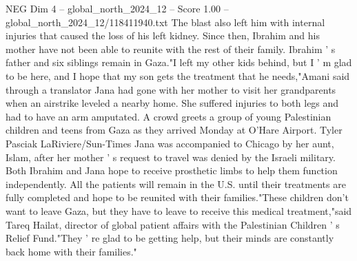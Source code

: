 \begin{textsample}{NEG Dim 4 – global\_north\_2024\_12 – Score 1.00 – global\_north\_2024\_12/118411940.txt}
The blast also left him with internal injuries that caused the loss of his left kidney.
Since then, Ibrahim and his mother have not been able to reunite with the rest of their family.
Ibrahim ' s father and six siblings remain in Gaza."I left my other kids behind, but I ' m glad to be here, and I hope that my son gets the treatment that he needs,"Amani said through a translator Jana had gone with her mother to visit her grandparents when an airstrike leveled a nearby home.
She suffered injuries to both legs and had to have an arm amputated.
A crowd greets a group of young Palestinian children and teens from Gaza as they arrived Monday at O'Hare Airport.
Tyler Pasciak LaRiviere/Sun-Times Jana was accompanied to Chicago by her aunt, Islam, after her mother ' s request to travel was denied by the Israeli military.
Both Ibrahim and Jana hope to receive prosthetic limbs to help them function independently.
All the patients will remain in the U.S. until their treatments are fully completed and hope to be reunited with their families."These children don't want to leave Gaza, but they have to leave to receive this medical treatment,"said Tareq Hailat, director of global patient affairs with the Palestinian Children ' s Relief Fund."They ' re glad to be getting help, but their minds are constantly back home with their families."

\end{textsample}
